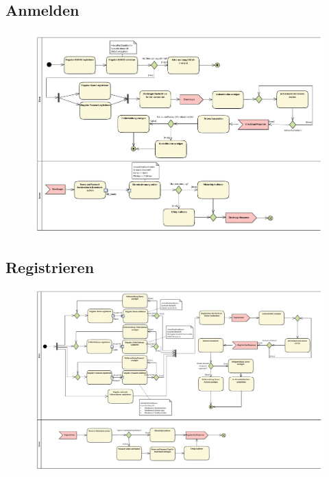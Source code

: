 \vfill

\subsection*{Anmelden}
\begin{figure}[h!]
	\centering
	\includegraphics[width=0.9\linewidth]{docs/3_Aktivitaetsdiagramme/Marius/Anmelden.pdf}
	\label{fig:ActDia_Anmelden}
\end{figure}

\vfill
\pagebreak
\vfill

\subsection*{Registrieren}
\begin{figure}[h!]
	\centering
	\includegraphics[width=0.9\linewidth]{docs/3_Aktivitaetsdiagramme/Marius/Registrieren.pdf}
	\label{fig:ActDia_Registrieren}
\end{figure}

\vfill

